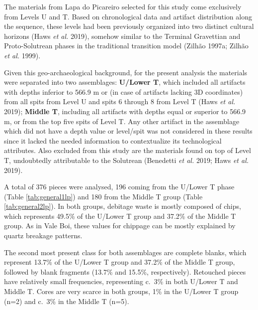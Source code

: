 \documentclass[12pt,twoside]{reedthesis}
\begin{document}
The materials from Lapa do Picareiro selected for this study come exclusively from Levels U and T. Based on chronological data and artifact distribution along the sequence, these levels had been previously organized into two distinct cultural horizons (Haws \emph{et al.} 2019), somehow similar to the Terminal Gravettian and Proto-Solutrean phases in the traditional transition model (Zilhão 1997a; Zilhão \emph{et al.} 1999).

Given this geo-archaeological background, for the present analysis the materials were separated into two assemblages: \textbf{U/Lower T}, which included all artifacts with depths inferior to 566.9 m or (in case of artifacts lacking 3D coordinates) from all spits from Level U and spits 6 through 8 from Level T (Haws \emph{et al.} 2019); \textbf{Middle T}, including all artifacts with depths equal or superior to 566.9 m, or from the top five spits of Level T. Any other artifact in the assemblage which did not have a depth value or level/spit was not considered in these results since it lacked the needed information to contextualize its technological attributes. Also excluded from this study are the materials found on top of Level T, undoubtedly attributable to the Solutrean (Benedetti \emph{et al.} 2019; Haws \emph{et al.} 2019).

A total of 376 pieces were analysed, 196 coming from the U/Lower T phase (Table \ref{tab:general1lp}) and 180 from the Middle T group (Table \ref{tab:general2lp}). In both groups, debitage waste is mostly composed of chips, which represents 49.5\% of the U/Lower T group and 37.2\% of the Middle T group. As in Vale Boi, these values for chippage can be mostly explained by quartz breakage patterns.

The second most present class for both assemblages are complete blanks, which represent 13.7\% of the U/Lower T group and 37.2\% of the Middle T group, followed by blank fragments (13.7\% and 15.5\%, respectively). Retouched pieces have relatively small frequencies, representing c.~3\% in both U/Lower T and Middle T. Cores are very scarce in both groups, 1\% in the U/Lower T group (n=2) and c.~3\% in the Middle T (n=5).

~
\end{document}
